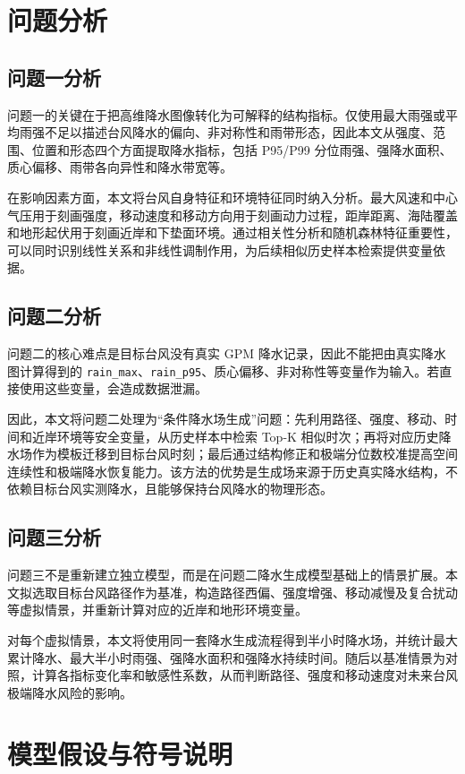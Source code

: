 \documentclass[UTF8,a4paper,zihao=5,fontset=fandol]{ctexart}
\numberwithin{equation}{section}
\numberwithin{figure}{section}
\numberwithin{table}{section}
\begin{document}
\section{问题分析}

\subsection{问题一分析}
问题一的关键在于把高维降水图像转化为可解释的结构指标。仅使用最大雨强或平均雨强不足以描述台风降水的偏向、非对称性和雨带形态，因此本文从强度、范围、位置和形态四个方面提取降水指标，包括 P95/P99 分位雨强、强降水面积、质心偏移、雨带各向异性和降水带宽等。

在影响因素方面，本文将台风自身特征和环境特征同时纳入分析。最大风速和中心气压用于刻画强度，移动速度和移动方向用于刻画动力过程，距岸距离、海陆覆盖和地形起伏用于刻画近岸和下垫面环境。通过相关性分析和随机森林特征重要性，可以同时识别线性关系和非线性调制作用，为后续相似历史样本检索提供变量依据。

\subsection{问题二分析}
问题二的核心难点是目标台风没有真实 GPM 降水记录，因此不能把由真实降水图计算得到的 \texttt{rain\_max}、\texttt{rain\_p95}、质心偏移、非对称性等变量作为输入。若直接使用这些变量，会造成数据泄漏。

因此，本文将问题二处理为“条件降水场生成”问题：先利用路径、强度、移动、时间和近岸环境等安全变量，从历史样本中检索 Top-K 相似时次；再将对应历史降水场作为模板迁移到目标台风时刻；最后通过结构修正和极端分位数校准提高空间连续性和极端降水恢复能力。该方法的优势是生成场来源于历史真实降水结构，不依赖目标台风实测降水，且能够保持台风降水的物理形态。

\subsection{问题三分析}
问题三不是重新建立独立模型，而是在问题二降水生成模型基础上的情景扩展。本文拟选取目标台风路径作为基准，构造路径西偏、强度增强、移动减慢及复合扰动等虚拟情景，并重新计算对应的近岸和地形环境变量。

对每个虚拟情景，本文将使用同一套降水生成流程得到半小时降水场，并统计最大累计降水、最大半小时雨强、强降水面积和强降水持续时间。随后以基准情景为对照，计算各指标变化率和敏感性系数，从而判断路径、强度和移动速度对未来台风极端降水风险的影响。

\section{模型假设与符号说明}
\end{document}
